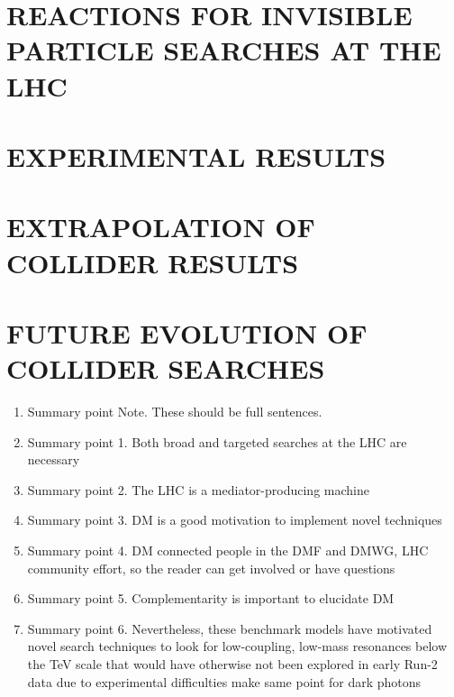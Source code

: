 \documentclass{ar-1col}
\begin{document}
%



\section{REACTIONS FOR INVISIBLE PARTICLE SEARCHES AT THE LHC}
\label{sec:02_Reactions}


\section{EXPERIMENTAL RESULTS}
\label{sec:03_ExperimentalResults}


\section{EXTRAPOLATION OF COLLIDER RESULTS}
\label{sec:04_Extrapolation}


\section{FUTURE EVOLUTION OF COLLIDER SEARCHES}
\label{sec:05_Future}


\clearpage

\begin{summary}
\begin{enumerate}
\item Summary point Note. These should be full sentences.
\item Summary point 1. Both broad and targeted searches at the LHC are necessary
\item Summary point 2. The LHC is a mediator-producing machine
\item Summary point 3. DM is a good motivation to implement novel techniques 
\item Summary point 4. DM connected people in the DMF and DMWG, LHC community effort, so the reader can get involved or have questions
\item Summary point 5. Complementarity is important to elucidate DM 
\item Summary point 6. Nevertheless, these benchmark models have motivated novel search techniques
to look for low-coupling, low-mass resonances below the TeV scale that would
have otherwise not been explored in early Run-2 data due to experimental difficulties make same point for dark photons
\end{enumerate}
\end{summary}
\end{document}

